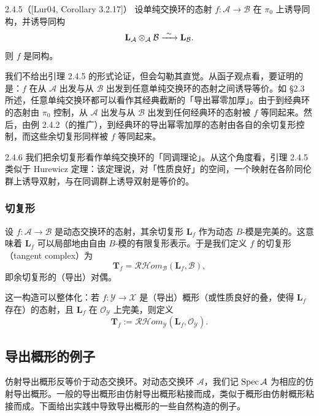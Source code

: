 \begin{lem}{2.4.5}（[Lur04, Corollary 3.2.17]）\label{lem:a6-01-1}
设单纯交换环的态射 $f:\mathcal A\to\mathcal B$ 在 $\pi_0$ 上诱导同构，并诱导同构
\[
\mathbf L_{\mathcal A}\otimes_{\mathcal A}\mathcal B\xrightarrow{\ \sim\ }\mathbf L_{\mathcal B}.
\]
则 $f$ 是同构。
\end{lem}

我们不给出引理 2.4.5 的形式论证，但会勾勒其直觉。从函子观点看，要证明的是：$f$ 在从 $\mathcal A$ 出发与从 $\mathcal B$ 出发到任意单纯交换环的态射之间诱导等价。如 §2.3 所述，任意单纯交换环都可以看作其经典截断的「导出幂零加厚」。由于到经典环的态射由 $\pi_0$ 控制，从 $\mathcal A$ 出发与从 $\mathcal B$ 出发到任何经典环的态射被 $f$ 等同起来。然后，由例 2.4.2（的推广），到经典环的导出幂零加厚的态射由各自的余切复形控制，而这些余切复形同样被 $f$ 等同起来。

\begin{rem}{2.4.6}\label{rem:a6-01-1}
我们把余切复形看作单纯交换环的「同调理论」。从这个角度看，引理 2.4.5 类似于 Hurewicz 定理：该定理说，对「性质良好」的空间，一个映射在各阶同伦群上诱导双射，与在同调群上诱导双射是等价的。
\end{rem}

\subsubsection{切复形}

设 $f:\mathcal A\to\mathcal B$ 是动态交换环的态射，其余切复形 $\mathbf L_f$ 作为动态 $B$-模是完美的。这意味着 $\mathbf L_f$ 可以局部地由自由 $B$-模的有限复形表示。于是我们定义 $f$ 的切复形（tangent complex）为
\[
\mathbf T_f=\mathcal{RH}om_{\mathcal B}(\mathbf L_f,\mathcal B),
\]
即余切复形的（导出）对偶。

这一构造可以整体化：若 $f:\mathcal Y\to\mathcal X$ 是（导出）概形（或性质良好的叠，使得 $\mathbf L_f$ 存在）的态射，且 $\mathbf L_f$ 在 $\mathcal O_{\mathcal Y}$ 上完美，则定义
\[
\mathbf T_f:=\mathcal{RH}om_{\mathcal Y}(\mathbf L_f,\mathcal O_{\mathcal Y}).
\]

\subsection{导出概形的例子}

仿射导出概形反等价于动态交换环。对动态交换环 $\mathcal A$，我们记 $\operatorname{Spec}\mathcal A$ 为相应的仿射导出概形。一般的导出概形由仿射导出概形粘接而成，类似于概形由仿射概形粘接而成。下面给出实践中导致导出概形的一些自然构造的例子。

